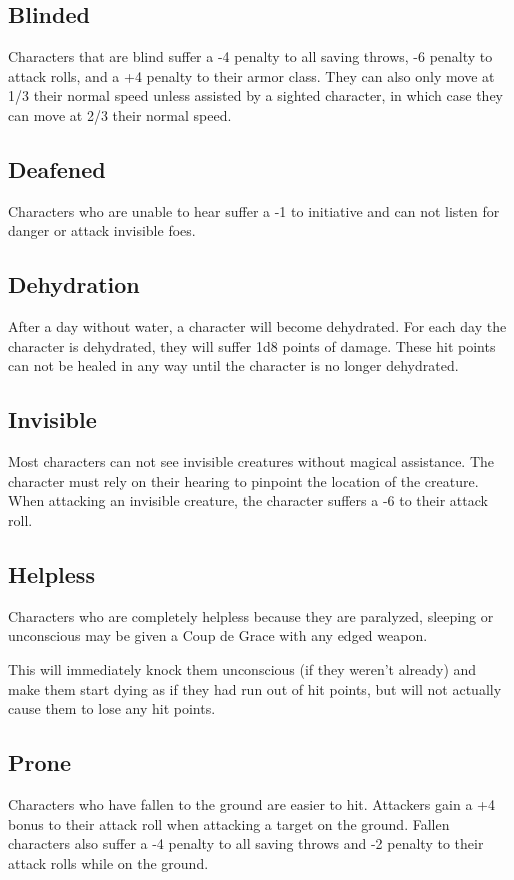 \begin{multicols*}{2}
\subsection{Blinded}\label{sec:Blinded}
Characters that are blind suffer a -4 penalty to all saving throws, -6 penalty to attack rolls, and a +4 penalty to their armor class. They can also only move at 1/3 their normal speed unless assisted by a sighted character, in which case they can move at 2/3 their normal speed.

\subsection{Deafened}
Characters who are unable to hear suffer a -1 to initiative and can not listen for danger or attack invisible foes.

\subsection{Dehydration}
After a day without water, a character will become dehydrated. For each day the character is dehydrated, they will suffer 1d8 points of damage. These hit points can not be healed in any way until the character is no longer dehydrated.

\subsection{Invisible}\label{sec:Invisible}
Most characters can not see invisible creatures without magical assistance. The character must rely on their hearing to pinpoint the location of the creature. When attacking an invisible creature, the character suffers a -6 to their attack roll.

\subsection{Helpless}\label{sec:Helpless}
Characters who are completely helpless because they are paralyzed, sleeping or unconscious may be given a Coup de Grace with any edged weapon.

This will immediately knock them unconscious (if they weren’t already) and make them start dying as if they had run out of hit points, but will not actually cause them to lose any hit points.

\subsection{Prone}\label{sec:Prone}
Characters who have fallen to the ground are easier to hit. Attackers gain a +4 bonus to their attack roll when attacking a target on the ground. Fallen characters also suffer a -4 penalty to all saving throws and -2 penalty to their attack rolls while on the ground.


\end{multicols*}
